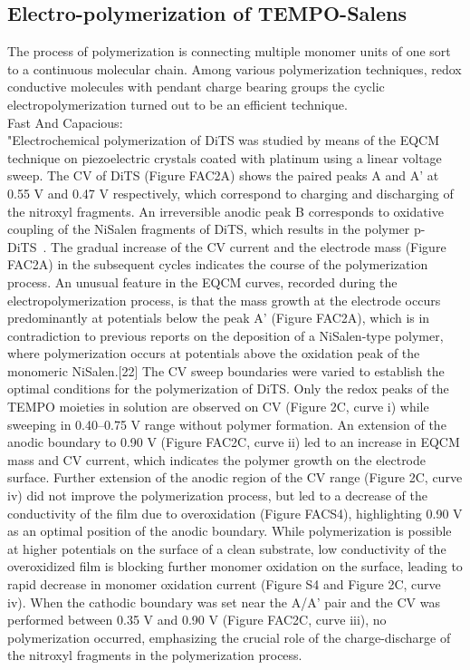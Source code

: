 \subsection{Electro-polymerization of TEMPO-Salens}
The process of polymerization is connecting multiple monomer units of one sort to a continuous molecular chain. Among various polymerization techniques, redox conductive molecules with pendant charge bearing groups the cyclic electropolymerization turned out to be an efficient technique. \\
Fast And Capacious:\\
"Electrochemical polymerization of DiTS was studied by means of the EQCM technique on piezoelectric crystals coated with platinum using a linear voltage sweep. The CV of DiTS (Figure FAC2A) shows the paired peaks A and A' at 0.55 V and 0.47 V respectively, which correspond to charging and discharging of the nitroxyl fragments. An irreversible anodic peak B corresponds to oxidative coupling of the NiSalen fragments
of DiTS, which results in the polymer p-DiTS~\cite{Vereshchagin_2019,Koshika_2009}. The gradual
increase of the CV current and the electrode mass (Figure FAC2A) in the subsequent cycles indicates the course of the polymerization process. An unusual feature in the EQCM curves, recorded during the electropolymerization process, is that the mass growth at the electrode occurs predominantly at potentials below the peak A' (Figure FAC2A), which is in contradiction to previous reports on the deposition of a NiSalen-type polymer, where polymerization occurs at potentials above the oxidation peak of the monomeric NiSalen.[22]
The CV sweep boundaries were varied to establish the optimal conditions for the polymerization of DiTS. Only the
redox peaks of the TEMPO moieties in solution are observed on CV (Figure 2C, curve i) while sweeping in 0.40–0.75 V range without polymer formation. An extension of the anodic
boundary to 0.90 V (Figure FAC2C, curve ii) led to an increase in EQCM mass and CV current, which indicates the polymer growth on the electrode surface. Further extension of the anodic region of the CV range (Figure 2C, curve iv) did not improve the polymerization process, but led to a decrease of
the conductivity of the film due to overoxidation (Figure FACS4), highlighting 0.90 V as an optimal position of the anodic boundary. While polymerization is possible at higher potentials on the surface of a clean substrate, low conductivity of the overoxidized film is blocking further monomer oxidation on the
surface, leading to rapid decrease in monomer oxidation current (Figure S4 and Figure 2C, curve iv). When the cathodic boundary was set near the A/A’ pair and the CV was performed
between 0.35 V and 0.90 V (Figure FAC2C, curve iii), no polymerization occurred, emphasizing the crucial role of the charge-discharge of the nitroxyl fragments in the polymerization process.\\

